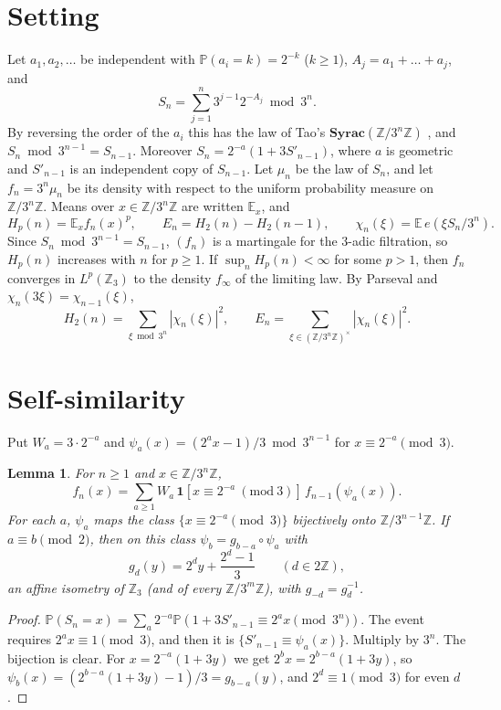 \documentclass[11pt]{article}
\newtheorem{lemma}[theorem]{Lemma}
\theoremstyle{remark}
\newcommand{\Z}{\mathbb Z}
\newcommand{\E}{\mathbb E}
\newcommand{\Prob}{\mathbb P}
\begin{document}
\section{Setting}
Let $a_1,a_2,\dots$ be independent with $\Prob(a_i=k)=2^{-k}$ ($k\ge1$), $A_j=a_1+\dots+a_j$, and
\[
 S_n=\sum_{j=1}^n3^{j-1}2^{-A_j}\bmod 3^n .
\]
By reversing the order of the $a_i$ this has the law of Tao's $\mathbf{Syrac}(\Z/3^n\Z)$ \cite{Tao}, and $S_n\bmod 3^{n-1}=S_{n-1}$. Moreover $S_n=2^{-a}(1+3S'_{n-1})$, where $a$ is geometric and $S'_{n-1}$ is an independent copy of $S_{n-1}$. Let $\mu_n$ be the law of $S_n$, and let $f_n=3^n\mu_n$ be its density with respect to the uniform probability measure on $\Z/3^n\Z$. Means over $x\in\Z/3^n\Z$ are written $\E_x$, and
\[
 H_p(n)=\E_x f_n(x)^p,\qquad E_n=H_2(n)-H_2(n-1),\qquad \chi_n(\xi)=\E\,e(\xi S_n/3^n).
\]
Since $S_n\bmod3^{n-1}=S_{n-1}$, $(f_n)$ is a martingale for the $3$-adic filtration, so $H_p(n)$ increases with $n$ for $p\ge1$. If $\sup_nH_p(n)<\infty$ for some $p>1$, then $f_n$ converges in $L^p(\Z_3)$ to the density $f_\infty$ of the limiting law. By Parseval and $\chi_n(3\xi)=\chi_{n-1}(\xi)$,
\begin{equation}\label{eq:parseval}
 H_2(n)=\sum_{\xi\bmod3^n}|\chi_n(\xi)|^2,\qquad E_n=\sum_{\xi\in(\Z/3^n\Z)^\times}|\chi_n(\xi)|^2 .
\end{equation}

\section{Self-similarity}
Put $W_a=3\cdot2^{-a}$ and $\psi_a(x)=(2^ax-1)/3\bmod3^{n-1}$ for $x\equiv2^{-a}\pmod3$.

\begin{lemma}\label{lem:selfsim}
For $n\ge1$ and $x\in\Z/3^n\Z$,
\[
 f_n(x)=\sum_{a\ge1}W_a\,\mathbf 1[x\equiv2^{-a}\ (\mathrm{mod}\ 3)]\,f_{n-1}(\psi_a(x)).
\]
For each $a$, $\psi_a$ maps the class $\{x\equiv2^{-a}\pmod 3\}$ bijectively onto $\Z/3^{n-1}\Z$. If $a\equiv b\pmod2$, then on this class $\psi_b=g_{b-a}\circ\psi_a$ with
\[
 g_d(y)=2^dy+\frac{2^d-1}{3}\qquad(d\in2\Z),
\]
an affine isometry of $\Z_3$ (and of every $\Z/3^m\Z$), with $g_{-d}=g_d^{-1}$.
\end{lemma}

\begin{proof}
$\Prob(S_n=x)=\sum_a2^{-a}\Prob(1+3S'_{n-1}\equiv2^ax\pmod{3^n})$. The event requires $2^ax\equiv1\pmod3$, and then it is $\{S'_{n-1}\equiv\psi_a(x)\}$. Multiply by $3^n$. The bijection is clear. For $x=2^{-a}(1+3y)$ we get $2^bx=2^{b-a}(1+3y)$, so $\psi_b(x)=(2^{b-a}(1+3y)-1)/3=g_{b-a}(y)$, and $2^d\equiv1\pmod3$ for even $d$.
\end{proof}
\end{document}
